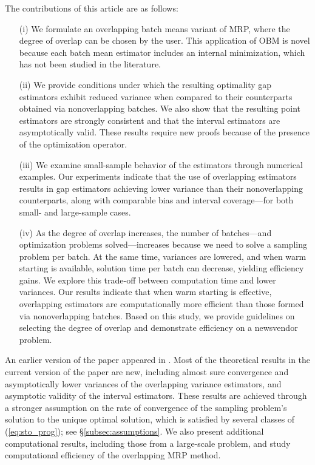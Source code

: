 \documentclass[12pt]{article}
\begin{document}
The contributions of this article are as follows: 
\begin{itemize}
\item[(i)] We formulate an overlapping batch means variant of MRP, where the degree of overlap can be chosen by the user.  
This application of OBM is novel because each batch mean estimator includes an internal minimization, which has not been studied in the literature.

\item[(ii)] We provide conditions under which the resulting optimality gap estimators exhibit reduced variance when compared to their counterparts obtained via nonoverlapping batches.
We also show that the resulting point estimators are strongly consistent and that the interval estimators are asymptotically valid. 
These results require new proofs because of the presence of the optimization operator. 

\item[(iii)] We examine small-sample behavior of the estimators through numerical examples. 
Our experiments indicate that the use of overlapping estimators results in gap estimators achieving lower variance than their nonoverlapping counterparts, along with comparable bias and interval coverage---for both small- and large-sample cases.

\item[(iv)] As the degree of overlap increases, the number of batches---and optimization problems solved---increases because we need to solve a sampling problem per batch. 
At the same time, variances are lowered, and when warm starting is available, solution time per batch can decrease, yielding efficiency gains. 
We explore this trade-off between computation time and lower variances.
Our results indicate that when warm starting is effective, overlapping estimators are computationally more efficient than those formed via nonoverlapping batches.
Based on this study, we provide guidelines on selecting the degree of overlap and demonstrate efficiency on a newsvendor problem. 
\end{itemize}


An earlier version of the paper appeared in \cite{love2011overlapping}. 
Most of the theoretical results in the current version of the paper are new, including almost sure convergence and asymptotically lower variances of the overlapping variance estimators, and asymptotic validity of the interval estimators. 
These results are achieved through a stronger assumption on the rate of convergence of the sampling problem's solution to the unique optimal solution, which is satisfied by several classes of (\ref{eq:sto_prog}); see \S \ref{subsec:assumptions}.
We also present additional computational results, including those from a large-scale problem, and study computational efficiency of the overlapping MRP method. 
\end{document}
